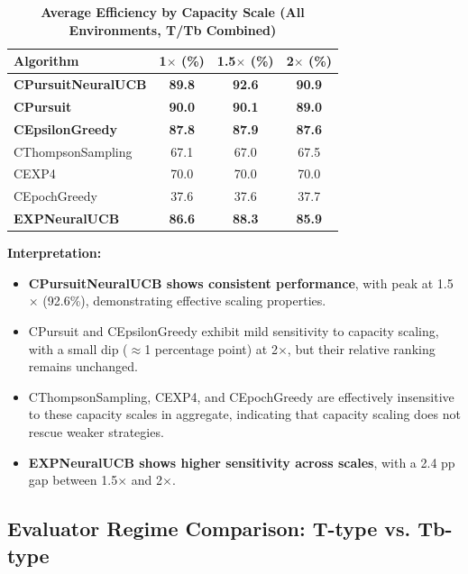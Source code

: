\documentclass[12pt,a4paper]{article}
\newcommand{\performance}[1]{\textcolor{performancecolor}{\textbf{#1}}}
\newcommand{\legacy}[1]{\textcolor{legacycolor}{\textbf{#1}}}
\newcommand{\neural}[1]{\textcolor{neuralcolor}{\textbf{#1}}}
\begin{document}
\begin{table}[H]
\centering
\caption{\performance{Average Efficiency by Capacity Scale (All Environments, T/Tb Combined)}}
\begin{tabular}{|l|c|c|c|}
\hline
\textbf{Algorithm} & \textbf{1$\times$ (\%)} & \textbf{1.5$\times$ (\%)} & \textbf{2$\times$ (\%)} \\
\hline
\hline
\neural{CPursuitNeuralUCB}   & \neural{89.8}     & \neural{92.6}     & \neural{90.9} \\
\performance{CPursuit}        & \performance{90.0} & \performance{90.1} & \performance{89.0} \\
\performance{CEpsilonGreedy} & \performance{87.8} & \performance{87.9} & \performance{87.6} \\
CThompsonSampling            & 67.1              & 67.0              & 67.5 \\
CEXP4                        & 70.0              & 70.0              & 70.0 \\
CEpochGreedy                 & 37.6              & 37.6              & 37.7 \\
\legacy{EXPNeuralUCB}        & \legacy{86.6}     & \legacy{88.3}     & \legacy{85.9} \\
\hline
\end{tabular}
\end{table}

\textbf{Interpretation:}
\begin{itemize}
\item \neural{CPursuitNeuralUCB shows consistent performance}, with peak at 1.5$\times$ (92.6\%), demonstrating effective scaling properties.
\item CPursuit and CEpsilonGreedy exhibit mild sensitivity to capacity scaling, with a small dip ($\approx$1 percentage point) at 2$\times$, but their relative ranking remains unchanged.
\item CThompsonSampling, CEXP4, and CEpochGreedy are effectively insensitive to these capacity scales in aggregate, indicating that capacity scaling does not rescue weaker strategies.
\item \legacy{EXPNeuralUCB shows higher sensitivity across scales}, with a 2.4 pp gap between 1.5$\times$ and 2$\times$.
\end{itemize}

\subsection{Evaluator Regime Comparison: T-type vs. Tb-type}
\end{document}
